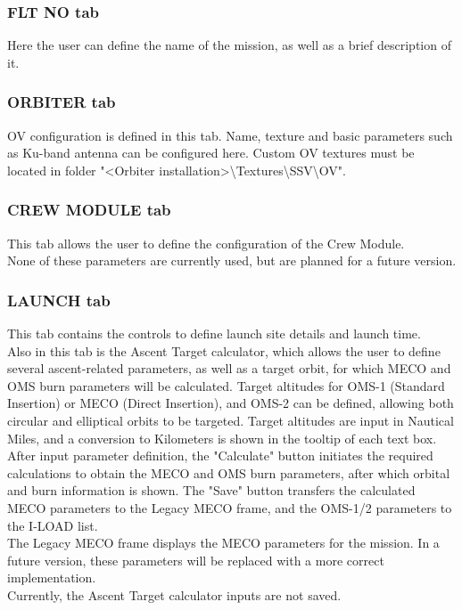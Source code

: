 \documentclass[Space_Shuttle_Vessel_Manual.tex]{subfiles}
\begin{document}
\begin{multicols*}{2}
\subsubsection{FLT NO tab}
Here the user can define the name of the mission, as well as a brief description of it.


\subsubsection{ORBITER tab}
OV configuration is defined in this tab. Name, texture and basic parameters such as Ku-band antenna can be configured here.
Custom OV textures must be located in folder "<Orbiter installation>\textbackslash Textures\textbackslash SSV\textbackslash OV".


\subsubsection{CREW MODULE tab}
This tab allows the user to define the configuration of the Crew Module.\\
None of these parameters are currently used, but are planned for a future version.


\subsubsection{LAUNCH tab}
This tab contains the controls to define launch site details and launch time.\\
Also in this tab is the Ascent Target calculator, which allows the user to define several ascent-related parameters, as well as a target orbit, for which MECO and OMS burn parameters will be calculated. Target altitudes for OMS-1 (Standard Insertion) or MECO (Direct Insertion), and OMS-2 can be defined, allowing both circular and elliptical orbits to be targeted. Target altitudes are input in Nautical Miles, and a conversion to Kilometers is shown in the tooltip of each text box.\\
After input parameter definition, the "Calculate" button initiates the required calculations to obtain the MECO and OMS burn parameters, after which orbital and burn information is shown. The "Save" button transfers the calculated MECO parameters to the Legacy MECO frame, and the OMS-1/2 parameters to the I-LOAD list.\\
The Legacy MECO frame displays the MECO parameters for the mission. In a future version, these parameters will be replaced with a more correct implementation.\\
Currently, the Ascent Target calculator inputs are not saved.\\



\end{multicols*}
\end{document}
